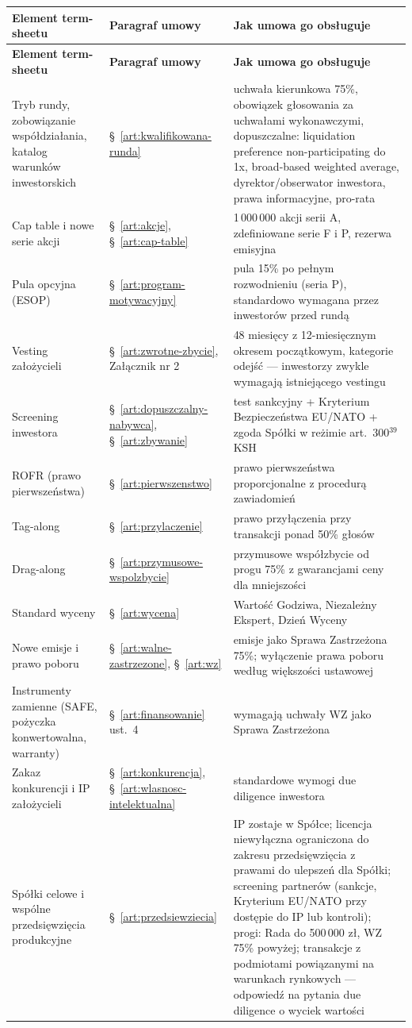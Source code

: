 \documentclass[12pt,a4paper]{report}
\begin{document}
\begin{longtable}{@{}p{5.2cm} p{3.4cm} p{6.2cm}@{}}
\toprule
\textbf{Element term-sheetu} & \textbf{Paragraf umowy} & \textbf{Jak umowa go obsługuje} \\
\midrule
\endfirsthead
\toprule
\textbf{Element term-sheetu} & \textbf{Paragraf umowy} & \textbf{Jak umowa go obsługuje} \\
\midrule
\endhead
Tryb rundy, zobowiązanie współdziałania, katalog warunków inwestorskich & §~\ref{art:kwalifikowana-runda} & uchwała kierunkowa 75\%, obowiązek głosowania za uchwałami wykonawczymi, dopuszczalne: liquidation preference non-participating do 1x, broad-based weighted average, dyrektor/obserwator inwestora, prawa informacyjne, pro-rata \\
Cap table i nowe serie akcji & §~\ref{art:akcje}, §~\ref{art:cap-table} & 1\,000\,000 akcji serii A, zdefiniowane serie F i P, rezerwa emisyjna \\
Pula opcyjna (ESOP) & §~\ref{art:program-motywacyjny} & pula 15\% po pełnym rozwodnieniu (seria P), standardowo wymagana przez inwestorów przed rundą \\
Vesting założycieli & §~\ref{art:zwrotne-zbycie}, Załącznik nr 2 & 48 miesięcy z 12-miesięcznym okresem początkowym, kategorie odejść --- inwestorzy zwykle wymagają istniejącego vestingu \\
Screening inwestora & §~\ref{art:dopuszczalny-nabywca}, §~\ref{art:zbywanie} & test sankcyjny + Kryterium Bezpieczeństwa EU/NATO + zgoda Spółki w reżimie art.~300$^{39}$ KSH \\
ROFR (prawo pierwszeństwa) & §~\ref{art:pierwszenstwo} & prawo pierwszeństwa proporcjonalne z procedurą zawiadomień \\
Tag-along & §~\ref{art:przylaczenie} & prawo przyłączenia przy transakcji ponad 50\% głosów \\
Drag-along & §~\ref{art:przymusowe-wspolzbycie} & przymusowe współzbycie od progu 75\% z gwarancjami ceny dla mniejszości \\
Standard wyceny & §~\ref{art:wycena} & Wartość Godziwa, Niezależny Ekspert, Dzień Wyceny \\
Nowe emisje i prawo poboru & §~\ref{art:walne-zastrzezone}, §~\ref{art:wz} & emisje jako Sprawa Zastrzeżona 75\%; wyłączenie prawa poboru według większości ustawowej \\
Instrumenty zamienne (SAFE, pożyczka konwertowalna, warranty) & §~\ref{art:finansowanie} ust.~4 & wymagają uchwały WZ jako Sprawa Zastrzeżona \\
Zakaz konkurencji i IP założycieli & §~\ref{art:konkurencja}, §~\ref{art:wlasnosc-intelektualna} & standardowe wymogi due diligence inwestora \\
Spółki celowe i wspólne przedsięwzięcia produkcyjne & §~\ref{art:przedsiewziecia} & IP zostaje w Spółce; licencja niewyłączna ograniczona do zakresu przedsięwzięcia z prawami do ulepszeń dla Spółki; screening partnerów (sankcje, Kryterium EU/NATO przy dostępie do IP lub kontroli); progi: Rada do 500\,000 zł, WZ 75\% powyżej; transakcje z podmiotami powiązanymi na warunkach rynkowych --- odpowiedź na pytania due diligence o wyciek wartości \\
\bottomrule
\end{longtable}
\end{document}
